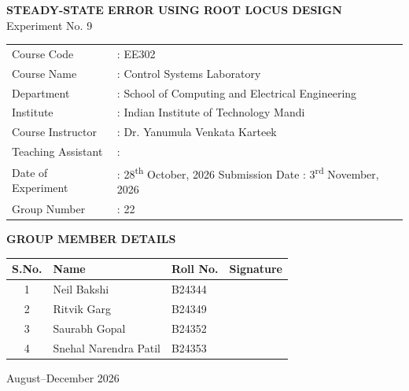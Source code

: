 \documentclass[lettersize,journal]{IEEEtran}
\begin{document}
\begin{titlepage}
\thispagestyle{empty}

\begin{center}
{\Large\bfseries STEADY-STATE ERROR USING ROOT LOCUS DESIGN}\\[10pt]
{\large Experiment No. 9}
\end{center}

\vspace{1.2cm}
\noindent
\begin{tabular}{@{}p{3.6cm}l@{}}
Course Code & : EE302 \\[3pt]
Course Name & : Control Systems Laboratory \\[3pt]
Department & : School of Computing and Electrical Engineering \\[3pt]
Institute & : Indian Institute of Technology Mandi \\[3pt]
Course Instructor & : Dr. Yanumula Venkata Karteek \\[3pt]
Teaching Assistant & : \\[3pt]
Date of Experiment & : 28\textsuperscript{th} October, 2026 \hspace{3.2cm} Submission Date : 3\textsuperscript{rd} November, 2026 \\[3pt]
Group Number & : 22 \\
\end{tabular}

\vspace{1.5cm}
\begin{center}
{\bfseries GROUP MEMBER DETAILS}\\[8pt]
\begin{tabular}{@{}clll@{}}
\toprule
S.No. & Name & Roll No. & Signature \\
\midrule
1 & Neil Bakshi & B24344 & \\[6pt]
2 & Ritvik Garg & B24349 & \\[6pt]
3 & Saurabh Gopal & B24352 & \\[6pt]
4 & Snehal Narendra Patil & B24353 & \\[6pt]
\bottomrule
\end{tabular}
\end{center}

\vfill
\begin{center}
August--December 2026
\end{center}

\end{titlepage}
\end{document}
